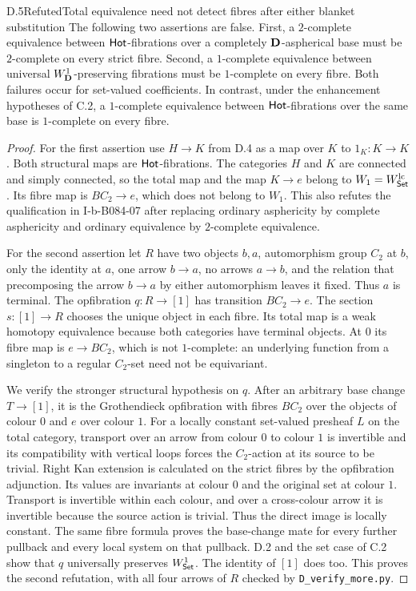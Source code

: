 \begin{claim}{D.5}{Refuted}{Total equivalence need not detect fibres after either blanket substitution}
The following two assertions are false. First, a $2$-complete equivalence between $\mathsf{Hot}$-fibrations over a completely $\mathbf D$-aspherical base must be $2$-complete on every strict fibre. Second, a $1$-complete equivalence between universal $W^1_{\mathbf D}$-preserving fibrations must be $1$-complete on every fibre. Both failures occur for set-valued coefficients. In contrast, under the enhancement hypotheses of C.2, a $1$-complete equivalence between $\mathsf{Hot}$-fibrations over the same base is $1$-complete on every fibre.
\end{claim}
\begin{proof}
For the first assertion use $H\to K$ from D.4 as a map over $K$ to $1_K:K\to K$. Both structural maps are $\mathsf{Hot}$-fibrations. The categories $H$ and $K$ are connected and simply connected, so the total map and the map $K\to e$ belong to $W_1=W^{\mathrm{lc}}_{\mathsf{Set}}$. Its fibre map is $BC_2\to e$, which does not belong to $W_1$. This also refutes the qualification in I-b-B084-07 after replacing ordinary asphericity by complete asphericity and ordinary equivalence by $2$-complete equivalence.

For the second assertion let $R$ have two objects $b,a$, automorphism group $C_2$ at $b$, only the identity at $a$, one arrow $b\to a$, no arrows $a\to b$, and the relation that precomposing the arrow $b\to a$ by either automorphism leaves it fixed. Thus $a$ is terminal. The opfibration $q:R\to[1]$ has transition $BC_2\to e$. The section $s:[1]\to R$ chooses the unique object in each fibre. Its total map is a weak homotopy equivalence because both categories have terminal objects. At $0$ its fibre map is $e\to BC_2$, which is not $1$-complete: an underlying function from a singleton to a regular $C_2$-set need not be equivariant.

We verify the stronger structural hypothesis on $q$. After an arbitrary base change $T\to[1]$, it is the Grothendieck opfibration with fibres $BC_2$ over the objects of colour $0$ and $e$ over colour $1$. For a locally constant set-valued presheaf $L$ on the total category, transport over an arrow from colour $0$ to colour $1$ is invertible and its compatibility with vertical loops forces the $C_2$-action at its source to be trivial. Right Kan extension is calculated on the strict fibres by the opfibration adjunction. Its values are invariants at colour $0$ and the original set at colour $1$. Transport is invertible within each colour, and over a cross-colour arrow it is invertible because the source action is trivial. Thus the direct image is locally constant. The same fibre formula proves the base-change mate for every further pullback and every local system on that pullback. D.2 and the set case of C.2 show that $q$ universally preserves $W^1_{\mathsf{Set}}$. The identity of $[1]$ does too. This proves the second refutation, with all four arrows of $R$ checked by \texttt{D\_verify\_more.py}.


\end{proof}
